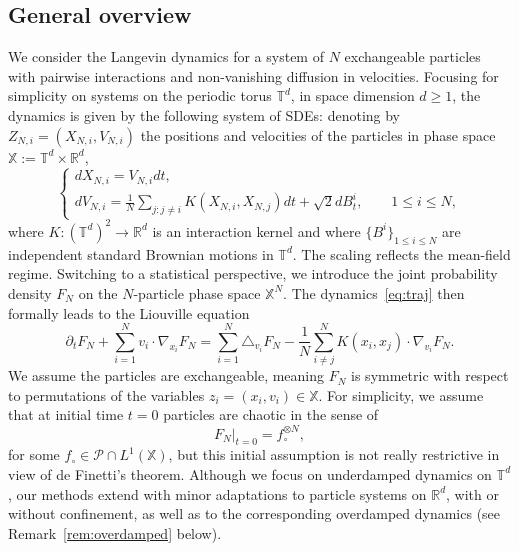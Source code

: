 \documentclass[a4paper,11pt,reqno,noindent]{amsart}
\theoremstyle{plain}
\theoremstyle{definition}
\numberwithin{equation}{section}
\newcommand{\Xd}{\mathbb X}
\newcommand{\R}{\mathbb R}
\newcommand{\T}{\mathbb T}
\newcommand{\Pc}{\mathcal{P}}
\begin{document}
\subsection{General overview}
We consider the Langevin dynamics for a system of $N$ exchangeable particles with pairwise interactions and non-vanishing diffusion in velocities. Focusing for simplicity on systems on the periodic torus $\T^d$, in space dimension $d\ge1$, the dynamics is given by the following system of SDEs: denoting by $Z_{N,i}=(X_{N,i},V_{N,i})$ the positions and velocities of the particles in phase space $\Xd:=\T^d\times\R^d$,
\begin{equation}\label{eq:traj}
\left\{\begin{array}{ll}
dX_{N,i}=V_{N,i}dt,\\
dV_{N,i}=\frac1N\sum_{j:j\ne i}K(X_{N,i},X_{N,j})dt+\sqrt2dB_t^i,\qquad1\le i\le N,
\end{array}\right.
\end{equation}
where $K:(\T^d)^2\to\R^d$ is an interaction kernel and where $\{B^i\}_{1\le i\le N}$ are independent standard Brownian motions in $\T^d$. The scaling reflects the mean-field regime. Switching to a statistical perspective, we introduce the joint probability density $F_N$ on the $N$-particle phase space $\Xd^N$. The dynamics~\eqref{eq:traj} then formally leads to the Liouville equation
\begin{equation}\label{eq:Liouville}
\partial_tF_N+\sum_{i=1}^Nv_i\cdot\nabla_{x_i}F_N=\sum_{i=1}^N\triangle_{v_i}F_N-\frac1N\sum_{i\ne j}^NK(x_i,x_j)\cdot\nabla_{v_i}F_N.
\end{equation}
We assume the particles are exchangeable, meaning $F_N$ is symmetric with respect to permutations of the variables $z_i=(x_i,v_i)\in\Xd$. For simplicity, we assume that at initial time $t=0$ particles are chaotic in the sense of
\begin{equation}\label{eq:chaotic-data}
F_N|_{t=0}=f_\circ^{\otimes N},
\end{equation}
for some $f_\circ\in \Pc\cap L^1(\Xd)$, but this initial assumption is not really restrictive in view of de Finetti's theorem.
Although we focus on underdamped dynamics on $\T^d$, our methods extend with minor adaptations to particle systems on $\R^d$, with or without confinement, as well as to the corresponding overdamped dynamics (see Remark~\ref{rem:overdamped} below).
\end{document}
